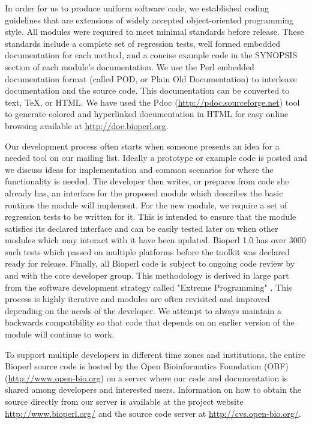 \documentclass[12pt]{article}
\begin{document}
In order for us to produce uniform software code, we established
coding guidelines that are extensions of widely accepted
object-oriented programming style.  All modules were required to meet
minimal standards before release.  These standards include a complete
set of regression tests, well formed embedded documentation for each
method, and a concise example code in the SYNOPSIS section of each
module's documentation.  We use the Perl embedded documentation format
(called POD, or Plain Old Documentation) to interleave documentation and
the source code.  This documentation can be converted to text, TeX, or
HTML.  We have used the Pdoc (\url{http://pdoc.sourceforge.net}) tool to
generate colored and hyperlinked documentation in HTML for easy
online browsing available at \url{http://doc.bioperl.org}.

Our development process often starts when someone presents an idea for
a needed tool on our mailing list.  Ideally a prototype or example
code is posted and we discuss ideas for implementation and common
scenarios for where the functionality is needed. The developer then
writes, or prepares from code she already has, an interface for the
proposed module which describes the basic routines the module will
implement.  For the new module, we require a set of regression tests
to be written for it.  This is intended to ensure that the module
satisfies its declared interface and can be easily tested later on
when other modules which may interact with it have been updated.
Bioperl 1.0 has over 3000 such tests which passed on multiple
platforms before the toolkit was declared ready for release.  Finally,
all Bioperl code is subject to ongoing code review by and with the
core developer group.  This methodology is derived in large part from
the software development strategy called "Extreme Programming"
\cite{xprogramming}.  This process is highly iterative and modules are
often revisited and improved depending on the needs of the developer.
We attempt to always maintain a backwards compatibility so that code
that depends on an earlier version of the module will continue to
work.

To support multiple developers in different time zones and
institutions, the entire Bioperl source code is hosted by the Open
Bioinformatics Foundation (OBF) (\url{http://www.open-bio.org}) on a
server where our code and documentation is shared among developers and
interested users.  Information on how to obtain the source directly
from our server is available at the project website
\url{http://www.bioperl.org/} and the source code server at
\url{http://cvs.open-bio.org/}.
\end{document}
